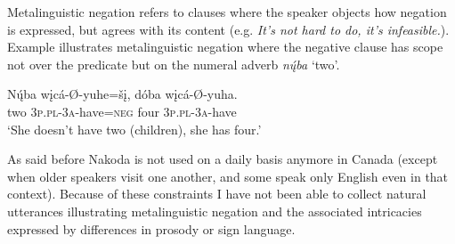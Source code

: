 \documentclass[output=paper,colorlinks,citecolor=brown]{langscibook}
\begin{document}
Metalinguistic negation refers to clauses where the speaker objects how negation is expressed, but agrees with its content (e.g. \textit{It’s not hard to do, it’s infeasible.}). Example  illustrates metalinguistic negation where the negative clause has scope not over the predicate but on the numeral adverb \textit{n\'{ų}ba} ‘two’.

\ea\label{ex:nak:79}
    \gll N\'{ų}ba wįcá-Ø-yuhe=šį, dóba wįcá-Ø-yuha. \\
         two \textsc{3p.pl-3a}-have=\textsc{neg} four \textsc{3p.pl-3a}-have \\
    \glt ‘She doesn’t have two (children), she has four.’ 
\z 

As said before Nakoda is not used on a daily basis anymore in Canada (except when older speakers visit one another, and some speak only English even in that context). Because of these constraints I have not been able to collect natural utterances illustrating metalinguistic negation and the associated intricacies expressed by differences in prosody or sign language. 
\end{document}
